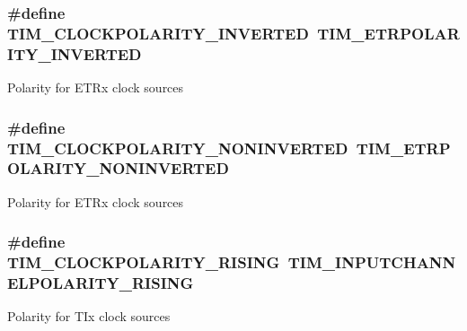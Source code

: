 \subsubsection[{\texorpdfstring{T\+I\+M\+\_\+\+C\+L\+O\+C\+K\+P\+O\+L\+A\+R\+I\+T\+Y\+\_\+\+I\+N\+V\+E\+R\+T\+ED}{TIM_CLOCKPOLARITY_INVERTED}}]{\setlength{\rightskip}{0pt plus 5cm}\#define T\+I\+M\+\_\+\+C\+L\+O\+C\+K\+P\+O\+L\+A\+R\+I\+T\+Y\+\_\+\+I\+N\+V\+E\+R\+T\+ED~{\bf T\+I\+M\+\_\+\+E\+T\+R\+P\+O\+L\+A\+R\+I\+T\+Y\+\_\+\+I\+N\+V\+E\+R\+T\+ED}}\hypertarget{group___t_i_m___clock___polarity_gae4eb585c466c2b5709ae3795204e7d3f}{}\label{group___t_i_m___clock___polarity_gae4eb585c466c2b5709ae3795204e7d3f}
Polarity for E\+T\+Rx clock sources 
\subsubsection[{\texorpdfstring{T\+I\+M\+\_\+\+C\+L\+O\+C\+K\+P\+O\+L\+A\+R\+I\+T\+Y\+\_\+\+N\+O\+N\+I\+N\+V\+E\+R\+T\+ED}{TIM_CLOCKPOLARITY_NONINVERTED}}]{\setlength{\rightskip}{0pt plus 5cm}\#define T\+I\+M\+\_\+\+C\+L\+O\+C\+K\+P\+O\+L\+A\+R\+I\+T\+Y\+\_\+\+N\+O\+N\+I\+N\+V\+E\+R\+T\+ED~{\bf T\+I\+M\+\_\+\+E\+T\+R\+P\+O\+L\+A\+R\+I\+T\+Y\+\_\+\+N\+O\+N\+I\+N\+V\+E\+R\+T\+ED}}\hypertarget{group___t_i_m___clock___polarity_gaca342866be2f9364274584688c733b60}{}\label{group___t_i_m___clock___polarity_gaca342866be2f9364274584688c733b60}
Polarity for E\+T\+Rx clock sources 
\subsubsection[{\texorpdfstring{T\+I\+M\+\_\+\+C\+L\+O\+C\+K\+P\+O\+L\+A\+R\+I\+T\+Y\+\_\+\+R\+I\+S\+I\+NG}{TIM_CLOCKPOLARITY_RISING}}]{\setlength{\rightskip}{0pt plus 5cm}\#define T\+I\+M\+\_\+\+C\+L\+O\+C\+K\+P\+O\+L\+A\+R\+I\+T\+Y\+\_\+\+R\+I\+S\+I\+NG~{\bf T\+I\+M\+\_\+\+I\+N\+P\+U\+T\+C\+H\+A\+N\+N\+E\+L\+P\+O\+L\+A\+R\+I\+T\+Y\+\_\+\+R\+I\+S\+I\+NG}}\hypertarget{group___t_i_m___clock___polarity_ga13cc7002cfa5ee42607e1a3d85f77b10}{}\label{group___t_i_m___clock___polarity_ga13cc7002cfa5ee42607e1a3d85f77b10}
Polarity for T\+Ix clock sources 